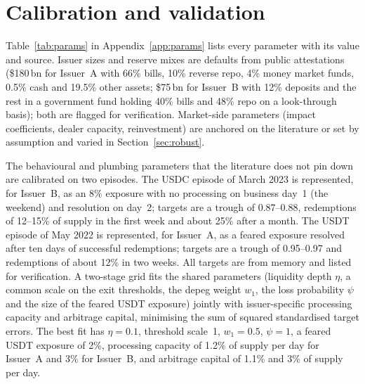 \section{Calibration and validation}\label{sec:calib}

Table~\ref{tab:params} in Appendix~\ref{app:params} lists every parameter with its value and source. Issuer sizes
and reserve mixes are defaults from public attestations (\$180\,bn for Issuer~A with 66\% bills, 10\% reverse
repo, 4\% money market funds, 0.5\% cash and 19.5\% other assets; \$75\,bn for Issuer~B with 12\% deposits and
the rest in a government fund holding 40\% bills and 48\% repo on a look-through basis); both are flagged for
verification. Market-side parameters (impact coefficients, dealer capacity, reinvestment) are anchored on the
literature or set by assumption and varied in Section~\ref{sec:robust}.

The behavioural and plumbing parameters that the literature does not pin down are calibrated on two episodes. The
USDC episode of March 2023 is represented, for Issuer~B, as an 8\% exposure with no processing on business day~1
(the weekend) and resolution on day~2; targets are a trough of 0.87--0.88, redemptions of 12--15\% of supply in
the first week and about 25\% after a month. The USDT episode of May 2022 is represented, for Issuer~A, as a
feared exposure resolved after ten days of successful redemptions; targets are a trough of 0.95--0.97 and
redemptions of about 12\% in two weeks. All targets are from memory and listed for verification. A two-stage grid
fits the shared parameters (liquidity depth $\eta$, a common scale on the exit thresholds, the depeg weight $w_1$,
the loss probability $\psi$ and the size of the feared USDT exposure) jointly with issuer-specific processing
capacity and arbitrage capital, minimising the sum of squared standardised target errors. The best fit has
$\eta=0.1$, threshold scale~1, $w_1=0.5$, $\psi=1$, a feared USDT exposure of 2\%, processing capacity of 1.2\% of
supply per day for Issuer~A and 3\% for Issuer~B, and arbitrage capital of 1.1\% and 3\% of supply per day.

\begin{table}[tbp]\centering\small
\caption{Validation against the two calibration episodes (300 paths, 10{,}000 agents). ``Observed'' is the target
with its tolerance; $z$ is the model minus the observed value in units of the tolerance; days are business days.
All observed values are to be verified.}\label{tab:validation}
\end{table}

